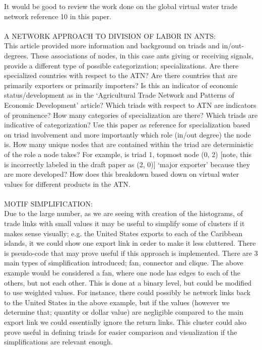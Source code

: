 It would be good to review the work done on the global virtual water trade network reference 10 in this paper.\\
\\
A NETWORK APPROACH TO DIVISION OF LABOR IN ANTS: ~\cite{networkApproach}\\
This article provided more information and background on triads and in/out-degrees. These associations of nodes, in this case ants giving or receiving signals, provide a different type of possible categorization; specializations. Are there specialized countries with respect to the ATN? Are there countries that are primarily exporters or primarily importers? Is this an indicator of economic status/development as in the ‘Agricultural Trade Network and Patterns of Economic Development’ article? Which triads with respect to ATN are indicators of prominence? How many categories of specialization are there? Which triads are indicative of categorization?
Use this paper as reference for specialization based on triad involvement and more importantly which role (in/out degree) the node is. How many unique nodes that are contained within the triad are deterministic of the role a node takes? For example, is triad 1, topmost node (0, 2) [note, this is incorrectly labeled in the draft paper as (2, 0)] ‘major exporter’ because they are more developed? How does this breakdown based down on virtual water values for different products in the ATN.\\
\\
MOTIF SIMPLIFICATION: ~\cite{dunne2013motif}\\
Due to the large number, as we are seeing with creation of the histograms, of trade links with small values it may be useful to simplify some of clusters if it makes sense visually; e.g. the United States exports to each of the Caribbean islands, it we could show one export link in order to make it less cluttered. There is pseudo-code that may prove useful if this approach is implemented.
There are 3 main types of simplification introduced; fan, connector and clique. The above example would be considered a fan, where one node has edges to each of the others, but not each other. This is done at a binary level, but could be modified to use weighted values. For instance, there could possibly be network links back to the United States in the above example, but if the values (however we determine that; quantity or dollar value) are negligible compared to the main export link we could essentially ignore the return links.
This cluster could also prove useful in defining triads for easier comparison and visualization if the simplifications are relevant enough.\\
